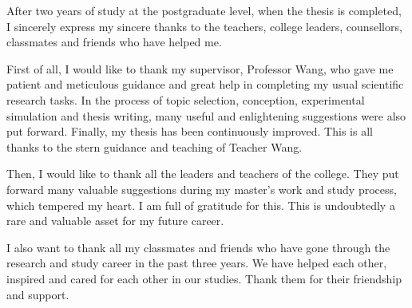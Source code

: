 
\begin{acknowledgments}

    After two years of study at the postgraduate level, when the thesis is completed, I sincerely express my sincere thanks to the teachers, college leaders, counsellors, classmates and friends who have helped me.

    First of all, I would like to thank my supervisor, Professor Wang, who gave me patient and meticulous guidance and great help in completing my usual scientific research tasks. In the process of topic selection, conception, experimental simulation and thesis writing, many useful and enlightening suggestions were also put forward. Finally, my thesis has been continuously improved. This is all thanks to the stern guidance and teaching of Teacher Wang.

    Then, I would like to thank all the leaders and teachers of the college. They put forward many valuable suggestions during my master's work and study process, which tempered my heart. I am full of gratitude for this. This is undoubtedly a rare and valuable asset for my future career.

    I also want to thank all my classmates and friends who have gone through the research and study career in the past three years. We have helped each other, inspired and cared for each other in our studies. Thank them for their friendship and support.

\end{acknowledgments}
